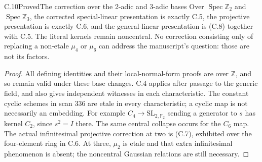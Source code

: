 \begin{statement}{C.10}{Proved}{The correction over the 2-adic and 3-adic bases}
Over $\operatorname{Spec}\mathbb Z_2$ and
$\operatorname{Spec}\mathbb Z_3$, the corrected special-linear
presentation is exactly C.5, the projective presentation is
exactly C.6, and the general-linear presentation is (C.8) together
with C.5. The literal kernels remain noncentral. No correction
consisting only of replacing a non-etale $\mu_4$ or $\mu_6$
can address the manuscript's question: those are not its factors.
\end{statement}
\begin{proof}
All defining identities and their local-normal-form proofs are
over $\mathbb Z$, and so remain valid under these base changes.
C.4 applies after passage to the generic field, and also gives
independent witnesses in each characteristic. The constant cyclic
schemes in scan 336 are etale in every characteristic; a cyclic
map is not necessarily an embedding. For example $C_4\to
\mathrm{SL}_{2,\mathbb F_2}$ sending a generator to $s$ has
kernel $C_2$, since $s^2=I$ there. The same central collapse
occurs for the $C_6$ map. The actual infinitesimal projective
correction at two is (C.7), exhibited over the four-element
ring in C.6. At three, $\mu_2$ is etale and that extra
infinitesimal phenomenon is absent; the noncentral Gaussian
relations are still necessary.
\end{proof}

